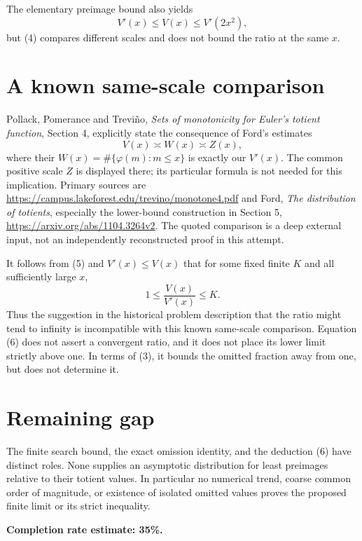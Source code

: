 \documentclass[11pt]{article}
\begin{document}
The elementary preimage bound also yields
\[
 V'(x)\le V(x)\le V'(2x^2), \tag{4}
\]
but (4) compares different scales and does not bound the ratio at the same $x$.

\section*{A known same-scale comparison}
Pollack, Pomerance and Trevi\~no, \emph{Sets of monotonicity for Euler's totient function}, Section 4, explicitly state the consequence of Ford's estimates
\[
 V(x)\asymp W(x)\asymp Z(x), \tag{5}
\]
where their $W(x)=\#\{\varphi(m):m\le x\}$ is exactly our $V'(x)$. The common positive scale $Z$ is displayed there; its particular formula is not needed for this implication. Primary sources are
\url{https://campus.lakeforest.edu/trevino/monotone4.pdf}
and Ford, \emph{The distribution of totients}, especially the lower-bound construction in Section 5,
\url{https://arxiv.org/abs/1104.3264v2}.
The quoted comparison is a deep external input, not an independently reconstructed proof in this attempt.

It follows from (5) and $V'(x)\le V(x)$ that for some fixed finite $K$ and all sufficiently large $x$,
\[
 1\le\frac{V(x)}{V'(x)}\le K. \tag{6}
\]
Thus the suggestion in the historical problem description that the ratio might tend to infinity is incompatible with this known same-scale comparison. Equation (6) does not assert a convergent ratio, and it does not place its lower limit strictly above one. In terms of (3), it bounds the omitted fraction away from one, but does not determine it.

\section*{Remaining gap}
The finite search bound, the exact omission identity, and the deduction (6) have distinct roles. None supplies an asymptotic distribution for least preimages relative to their totient values. In particular no numerical trend, coarse common order of magnitude, or existence of isolated omitted values proves the proposed finite limit or its strict inequality.

\textbf{Completion rate estimate: 35\%.}
\end{document}
